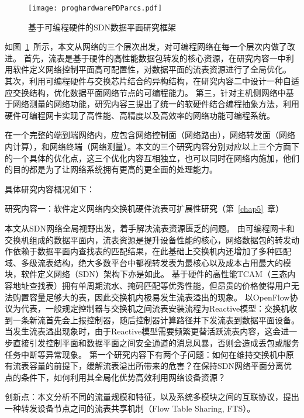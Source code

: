 \begin{figure}[!ht]
	\centering 
	\vspace{-1.5mm} 
	\texttt{[image: proghardwarePDParcs.pdf]}
	\caption{基于可编程硬件的SDN数据平面研究框架} \label{fig:proghardwarePDParcs}
\end{figure}

如图~\ref{fig:proghardwarePDParcs}~所示，本文从网络的三个层次出发，对可编程网络在每一个层次内做了改进。
首先，流表是基于硬件的高性能数据包转发的核心资源，在研究内容一中利用软件定义网络控制平面高可配置性，对数据平面的流表资源进行了全局优化。
其次，利用可编程硬件与交换芯片结合的异构结构，在研究内容二中设计一种自适应交换结构，优化数据平面网络节点的可编程能力。
第三，针对主机侧网络中基于网络测量的网络功能，研究内容三提出了统一的软硬件结合编程抽象方法，利用硬件可编程网卡实现了高性能、高精度以及高效率的网络功能可编程系统。

在一个完整的端到端网络内，应包含网络控制面（网络路由），网络转发面（网络内计算），和网络终端（网络测量）。本文的三个研究内容分别对应以上三个方面下的一个具体的优化点，这三个优化内容互相独立，也可以同时在网络内施加，他们的目的都是为了让网络系统拥有更高的更全面的处理能力。


具体研究内容概况如下：

{\hei 研究内容一：软件定义网络内交换机硬件流表可扩展性研究（第~\ref{chap5}~章）}

{\hei 本文从SDN网络全局视野出发，着手解决流表资源匮乏的问题。}
由可编程网卡和交换机组成的数据平面内，流表资源是提升设备性能的核心，网络数据包的转发动作依赖于数据平面内查找表的匹配结果，在此基础上交换机内还增加了多种匹配域、多级流表结构，绝大多数平台中都视转发表为最核心以及成本占用最大的模块，软件定义网络（SDN）架构下亦是如此。
基于硬件的高性能TCAM（三态内容地址查找表）拥有单周期流水、掩码匹配等优秀性能，但昂贵的价格使得用户无法购置容量足够大的表，因此交换机内极易发生流表溢出的现象。
以OpenFlow协议为代表，一般规定控制器与交换机之间流表安装流程为Reactive模型：交换机收到一条新流首先会上报控制器，随后控制器计算路径并下发流表到数据平面设备。
当发生流表溢出现象时，由于Reactive模型需要频繁更替活跃流表内容，这会进一步直接引发控制平面和数据平面之间安全通道的消息风暴，否则会造成丢包或服务任务中断等异常现象。
第一个研究内容下有两个子问题：如何在维持交换机中原有流表容量的前提下，缓解流表溢出所带来的危害？在保持SDN网络平面分离优点的条件下，如何利用其全局化优势高效利用网络设备资源？


{\hei 创新点：}本文分析不同的流量规模和特征，以及系统多模块之间的互联协议，提出一种转发设备节点之间的流表共享机制（Flow Table Sharing, FTS）。

